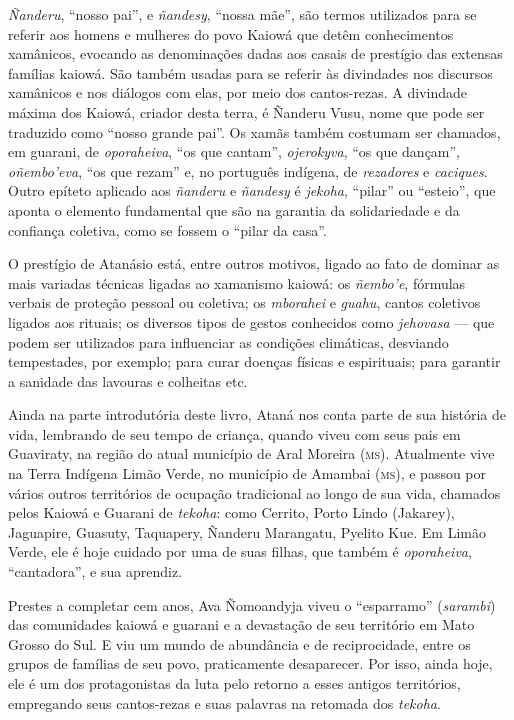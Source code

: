\textit{Ñanderu}, ``nosso pai'', e \textit{ñandesy}, ``nossa mãe'', são
termos utilizados para se referir aos homens e mulheres do povo Kaiowá
que detêm conhecimentos xamânicos, evocando as denominações dadas aos
casais de prestígio das extensas famílias kaiowá. São também usadas para se
referir às divindades nos discursos xamânicos e nos diálogos com elas,
por meio dos cantos-rezas. A divindade máxima dos Kaiowá, criador desta
terra, é Ñanderu Vusu, nome que pode ser traduzido como ``nosso grande
pai''. Os xamãs também costumam ser chamados, em guarani, de
\textit{oporaheiva}, ``os que cantam'', \textit{ojerokyva}, ``os que
dançam'', \textit{oñembo'eva}, ``os que rezam'' e, no português indígena,
de \textit{rezadores} e \textit{caciques}. Outro epíteto aplicado aos
\textit{ñanderu} e \textit{ñandesy} é \textit{jekoha}, ``pilar'' ou ``esteio'',
que aponta o elemento fundamental que são na garantia da solidariedade e
da confiança coletiva, como se fossem o ``pilar da casa''.

O prestígio de Atanásio está, entre outros motivos, ligado ao fato de
dominar as mais variadas técnicas ligadas ao xamanismo kaiowá: os
\textit{ñembo'e}, fórmulas verbais de proteção pessoal ou coletiva; os
\textit{mborahei} e \textit{guahu}, cantos coletivos ligados aos rituais; os
diversos tipos de gestos conhecidos como \textit{jehovasa} --- que podem ser
utilizados para influenciar as condições climáticas, desviando
tempestades, por exemplo; para curar doenças físicas e espirituais; para
garantir a sanidade das lavouras e colheitas etc.

Ainda na parte introdutória deste livro, Ataná nos conta
parte de sua história de vida, lembrando de seu tempo de criança, quando
viveu com seus pais em Guaviraty, na região do atual município de Aral
Moreira (\textsc{ms}). Atualmente vive na Terra Indígena Limão Verde, no
município de Amambai (\textsc{ms}), e passou por vários outros territórios de ocupação tradicional ao longo de sua vida, chamados pelos
Kaiowá e Guarani de \textit{tekoha}: como Cerrito, Porto Lindo (Jakarey),
Jaguapire, Guasuty, Taquapery, Ñanderu Marangatu, Pyelito Kue. Em Limão
Verde, ele é hoje cuidado por uma de suas filhas, que também é
\textit{oporaheiva}, ``cantadora'', e sua aprendiz.

Prestes a completar cem anos, Ava Ñomoandyja viveu o ``esparramo''
(\textit{sarambi}) das comunidades kaiowá e guarani e a devastação de seu
território em Mato Grosso do Sul. E viu um mundo de abundância e de
reciprocidade, entre os grupos de famílias de seu povo, praticamente
desaparecer. Por isso, ainda hoje, ele é um dos protagonistas da luta
pelo retorno a esses antigos territórios, empregando seus cantos-rezas e
suas palavras na retomada dos \textit{tekoha}.

